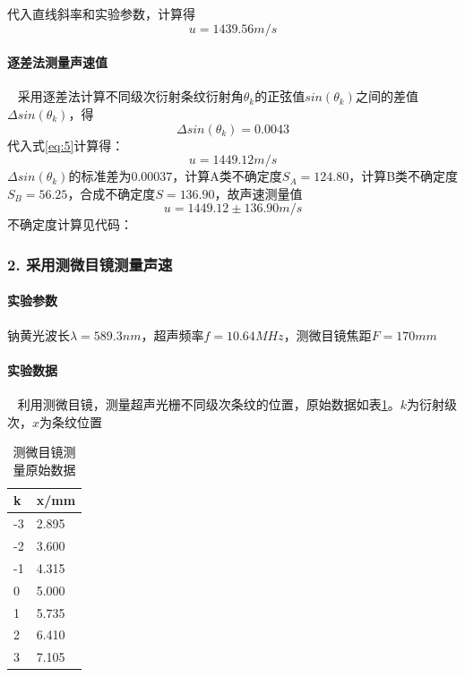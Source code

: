 \documentclass[12pt,a4paper,UTF8]{ctexart}
\begin{document}
		代入直线斜率和实验参数，计算得
		$$
		u = 1439.56 m/s
		$$

		\paragraph{逐差法测量声速值}~
		\newline
		\indent
		采用逐差法计算不同级次衍射条纹衍射角$\theta_k$的正弦值$sin(\theta_k)$之间的差值$\Delta sin(\theta_k)$，得
		$$
		\Delta sin(\theta_k) = 0.0043
		$$
		代入式\ref{eq:5}计算得：
		$$
		u = 1449.12 m/s
		$$
		$\Delta sin(\theta_k)$的标准差为$0.00037$，计算A类不确定度$S_A = 124.80$，计算B类不确定度$S_B = 56.25$，合成不确定度$S = 136.90$，故声速测量值
		$$
		u = 1449.12 \pm 136.90 m/s
		$$
        不确定度计算见代码：


		
	\subsubsection*{2. 采用测微目镜测量声速}
		\paragraph{实验参数} 钠黄光波长$\lambda = 589.3 nm$，超声频率$f = 10.64 MHz$，测微目镜焦距$F = 170mm$
		\paragraph{实验数据}~
		\newline
		\indent
		利用测微目镜，测量超声光栅不同级次条纹的位置，原始数据如表\ref{tab:3}。$k$为衍射级次，$x$为条纹位置
		\begin{table}[htbp]
			\centering
			\begin{tabular}{|l|l|}
			\hline
				k & x/mm \\ \hline
				-3 & 2.895 \\ \hline
				-2 & 3.600 \\ \hline
				-1 & 4.315 \\ \hline
				0 & 5.000 \\ \hline
				1 & 5.735 \\ \hline
				2 & 6.410 \\ \hline
				3 & 7.105 \\ \hline
			\end{tabular}
			\caption{测微目镜测量原始数据}
			\label{tab:3}
		\end{table}
\end{document}
